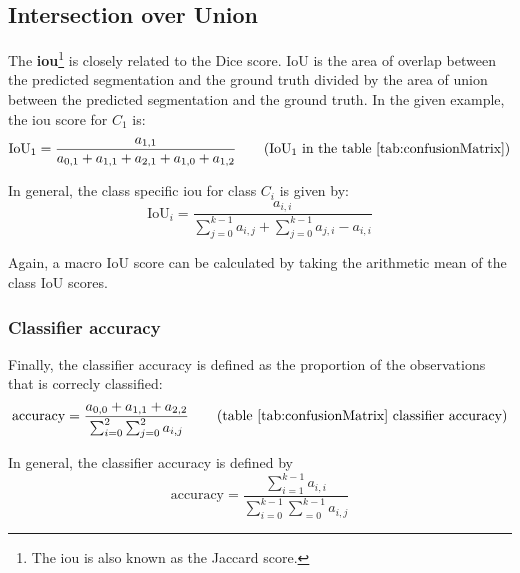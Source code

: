 \subsection{Intersection over Union}

The \textbf{\acrfull{iou}}\footnote{The \acrshort{iou} is also known as the Jaccard score.} is closely related to the Dice score.
IoU is the area of overlap between the predicted segmentation and the ground truth divided by the area of union between the predicted segmentation and the ground truth.
In the given example, the \acrshort{iou} score for $C_1$ is:
\begin{equation}
    \text{IoU}_1 = \frac{a_{1,1}}{a_{0,1}+a_{1,1}+a_{2,1}+a_{1,0}+a_{1,2}} \tag{IoU$_1$ in the table \ref{tab:confusionMatrix}}
\end{equation}

In general, the class specific \acrfull{iou} for class $C_i$ is given by:
\begin{equation}
    \text{IoU}_i = \frac{a_{i,i}}{\sum_{j=0}^{k-1} a_{i, j} + \sum_{j=0}^{k-1} a_{j,i} - a_{i,i}} 
\end{equation}

Again, a macro IoU score can be calculated by taking the arithmetic mean of the class IoU scores.

\subsubsection{Classifier accuracy}

Finally, the classifier accuracy is defined as the proportion of the observations that is correcly classified:
\begin{equation}
    \text{accuracy} = \frac{a_{0,0} + a_{1,1} + a_{2,2}}{\sum_{i=0}^{2} \sum_{j=0}^{2} a_{i,j}   } \tag{table \ref{tab:confusionMatrix} classifier accuracy}
\end{equation}

In general, the classifier accuracy is defined by 
\begin{equation}
    \text{accuracy} = \frac{\sum_{i=1}^{k-1}a_{i,i}}{\sum_{i=0}^{k-1} \sum_{=0}^{k-1} a_{i,j}   } 
\end{equation}


